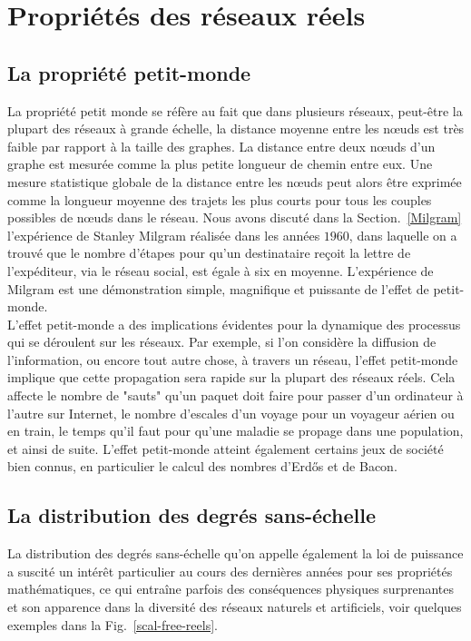 \section{Propriétés des réseaux réels}
\subsection{La propriété petit-monde}
La propriété petit monde se réfère au fait que dans plusieurs réseaux, peut-être la plupart des réseaux à grande échelle, la distance moyenne entre les nœuds est très faible par rapport à la taille des graphes. La distance entre deux nœuds d'un graphe est mesurée comme la plus petite longueur de chemin entre eux. Une mesure statistique globale de la distance entre les nœuds peut alors être exprimée comme la longueur moyenne des trajets  les plus courts pour tous les couples possibles de nœuds dans le réseau. Nous avons discuté dans la Section.~\ref{Milgram} l'expérience de Stanley Milgram réalisée dans les années $1960$, dans laquelle on a trouvé que le nombre d'étapes pour qu'un destinataire reçoit la lettre de l'expéditeur, via le réseau social, est égale à six en moyenne. L'expérience de Milgram est une démonstration simple, magnifique et puissante de l'effet de petit-monde.\\
L'effet petit-monde a des implications évidentes pour la dynamique des processus qui se déroulent sur les réseaux. Par exemple, si l'on considère la diffusion de l'information, ou encore tout autre chose, à travers un réseau, l'effet petit-monde implique que cette propagation sera rapide sur la plupart des réseaux réels. Cela affecte le nombre de "sauts" qu'un paquet doit faire pour passer d'un ordinateur à l'autre sur Internet, le nombre d'escales d'un voyage pour un voyageur aérien ou en train, le temps qu'il faut pour qu'une maladie se propage dans
une population, et ainsi de suite. L'effet petit-monde atteint également certains jeux de société bien connus, en particulier le calcul des nombres d'Erd\H{o}s \cite{RG1999} et de Bacon.

\subsection{La distribution des degrés sans-échelle}
\label{s-libre-echelle}
La distribution des degrés sans-échelle qu'on appelle également la loi de puissance a suscité un intérêt particulier au cours des dernières années pour ses propriétés mathématiques, ce qui entraîne parfois des conséquences physiques surprenantes et son apparence dans la diversité des réseaux naturels et artificiels, voir quelques exemples dans la Fig.~\ref{scal-free-reels}.\\


